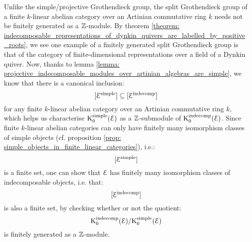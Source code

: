             \begin{remark} \label{remark: finiteness_of_split_grothendieck_groups}
                Unlike the simple/projective Grothendieck group, the split Grothendieck group of a finite $k$-linear abelian category over an Artinian commutative ring $k$ needs not be finitely generated as a $\mathbb{Z}$-module. By theorem \ref{theorem: indecomposable_representations_of_dynkin_quivers_are_labelled_by_positive_roots}, we see one example of a finitely generated split Grothendieck group is that of the category of finite-dimensional representations over a field of a Dynkin quiver. Now, thanks to lemma \ref{lemma: projective_indecomposable_modules_over_artinian_algebras_are_simple}, we know that there is a canonical inclusion:
                    $$[\mathcal{E}^{\mathrm{simple}}] \subseteq [\mathcal{E}^{\mathrm{indecomp}}]$$
                for any finite $k$-linear abelian category over an Artinian commutative ring $k$, which helps us characterise $\mathrm{K}_0^{\mathrm{simple}}(\mathcal{E})$ as a $\mathbb{Z}$-submodule of $\mathrm{K}_0^{\mathrm{indecomp}}(\mathcal{E})$. Since finite $k$-linear abelian categories can only have finitely many isomorphism classes of simple objects (cf. proposition \ref{prop: simple_objects_in_finite_linear_categories}), i.e.:
                    $$[\mathcal{E}^{\mathrm{simple}}]$$
                is a finite set, one can show that $\mathcal{E}$ has finitely many isomorphism classes of indecomposable objects, i.e. that:
                    $$[\mathcal{E}^{\mathrm{indecomp}}]$$
                is also a finite set, by checking whether or not the quotient:
                    $$\mathrm{K}_0^{\mathrm{indecomp}}(\mathcal{E})/\mathrm{K}_0^{\mathrm{simple}}(\mathcal{E})$$
                is finitely generated as a $\mathbb{Z}$-module. 
            \end{remark}
            
